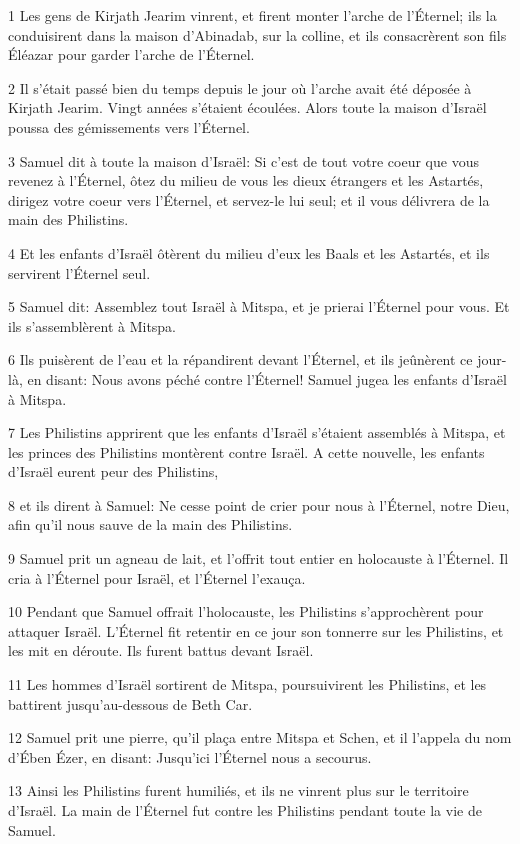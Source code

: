 \par 1 Les gens de Kirjath Jearim vinrent, et firent monter l'arche de l'Éternel; ils la conduisirent dans la maison d'Abinadab, sur la colline, et ils consacrèrent son fils Éléazar pour garder l'arche de l'Éternel.
\par 2 Il s'était passé bien du temps depuis le jour où l'arche avait été déposée à Kirjath Jearim. Vingt années s'étaient écoulées. Alors toute la maison d'Israël poussa des gémissements vers l'Éternel.
\par 3 Samuel dit à toute la maison d'Israël: Si c'est de tout votre coeur que vous revenez à l'Éternel, ôtez du milieu de vous les dieux étrangers et les Astartés, dirigez votre coeur vers l'Éternel, et servez-le lui seul; et il vous délivrera de la main des Philistins.
\par 4 Et les enfants d'Israël ôtèrent du milieu d'eux les Baals et les Astartés, et ils servirent l'Éternel seul.
\par 5 Samuel dit: Assemblez tout Israël à Mitspa, et je prierai l'Éternel pour vous. Et ils s'assemblèrent à Mitspa.
\par 6 Ils puisèrent de l'eau et la répandirent devant l'Éternel, et ils jeûnèrent ce jour-là, en disant: Nous avons péché contre l'Éternel! Samuel jugea les enfants d'Israël à Mitspa.
\par 7 Les Philistins apprirent que les enfants d'Israël s'étaient assemblés à Mitspa, et les princes des Philistins montèrent contre Israël. A cette nouvelle, les enfants d'Israël eurent peur des Philistins,
\par 8 et ils dirent à Samuel: Ne cesse point de crier pour nous à l'Éternel, notre Dieu, afin qu'il nous sauve de la main des Philistins.
\par 9 Samuel prit un agneau de lait, et l'offrit tout entier en holocauste à l'Éternel. Il cria à l'Éternel pour Israël, et l'Éternel l'exauça.
\par 10 Pendant que Samuel offrait l'holocauste, les Philistins s'approchèrent pour attaquer Israël. L'Éternel fit retentir en ce jour son tonnerre sur les Philistins, et les mit en déroute. Ils furent battus devant Israël.
\par 11 Les hommes d'Israël sortirent de Mitspa, poursuivirent les Philistins, et les battirent jusqu'au-dessous de Beth Car.
\par 12 Samuel prit une pierre, qu'il plaça entre Mitspa et Schen, et il l'appela du nom d'Ében Ézer, en disant: Jusqu'ici l'Éternel nous a secourus.
\par 13 Ainsi les Philistins furent humiliés, et ils ne vinrent plus sur le territoire d'Israël. La main de l'Éternel fut contre les Philistins pendant toute la vie de Samuel.

